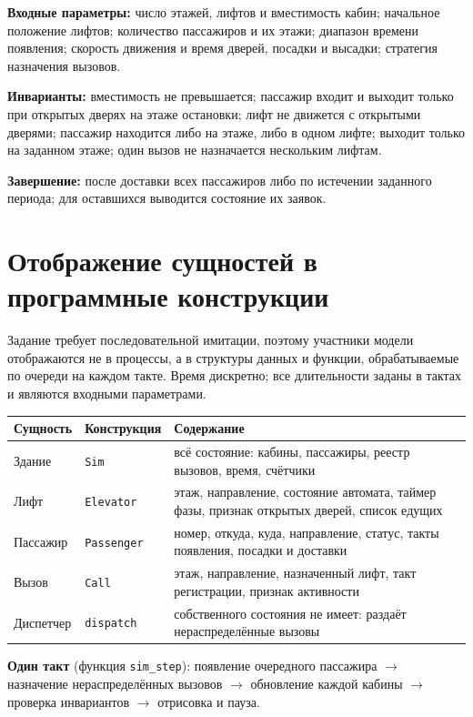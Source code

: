\documentclass[12pt,a4paper]{article}
\begin{document}
\textbf{Входные параметры:} число этажей, лифтов и вместимость кабин;
начальное положение лифтов; количество пассажиров и их этажи; диапазон
времени появления; скорость движения и время дверей, посадки и высадки;
стратегия назначения вызовов.

\textbf{Инварианты:} вместимость не превышается; пассажир входит и выходит
только при открытых дверях на этаже остановки; лифт не движется с
открытыми дверями; пассажир находится либо на этаже, либо в одном лифте;
выходит только на заданном этаже; один вызов не назначается нескольким
лифтам.

\textbf{Завершение:} после доставки всех пассажиров либо по истечении
заданного периода; для оставшихся выводится состояние их заявок.

\section{Отображение сущностей в программные конструкции}

Задание требует последовательной имитации, поэтому участники модели
отображаются не в процессы, а в структуры данных и функции, обрабатываемые
по очереди на каждом такте. Время дискретно; все длительности заданы в
тактах и являются входными параметрами.

\begin{center}
\begin{tabular}{@{}p{30mm}p{32mm}p{85mm}@{}}
\textbf{Сущность} & \textbf{Конструкция} & \textbf{Содержание} \\
\hline
Здание & \verb|Sim| & всё состояние: кабины, пассажиры, реестр вызовов,
время, счётчики \\
Лифт & \verb|Elevator| & этаж, направление, состояние автомата, таймер
фазы, признак открытых дверей, список едущих \\
Пассажир & \verb|Passenger| & номер, откуда, куда, направление, статус,
такты появления, посадки и доставки \\
Вызов & \verb|Call| & этаж, направление, назначенный лифт, такт
регистрации, признак активности \\
Диспетчер & \verb|dispatch| & собственного состояния не имеет: раздаёт
нераспределённые вызовы \\
\hline
\end{tabular}
\end{center}

\textbf{Один такт} (функция \verb|sim_step|): появление очередного
пассажира $\to$ назначение нераспределённых вызовов $\to$ обновление
каждой кабины $\to$ проверка инвариантов $\to$ отрисовка и пауза.
\end{document}
